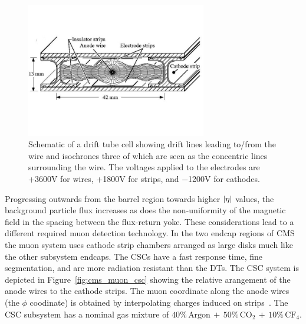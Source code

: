 \begin{figure}[htbp]
\centering
     \includegraphics[width=0.7\textwidth]{cms_and_lhc/plots/cms_muon_dt.jpg}
     \caption{
Schematic of a drift tube cell showing drift lines leading to/from the wire 
and isochrones three of which are seen as the concentric lines surrounding the wire. The voltages applied to the 
electrodes are +3600V for wires, +1800V for strips, and −1200V for cathodes.
     }
     \label{fig:cms_muon_dt}
\end{figure}

Progressing outwards from the barrel region towards higher $\lvert\eta\rvert$ values, the background 
particle flux increases as does the non-uniformity of the magnetic field in the spacing between
the flux-return yoke. These considerations lead to a different required muon detection technology.
In the two endcap regions of CMS the muon system uses cathode strip chambers arranged as large
disks much like the other subsystem endcaps. The CSCs have a fast 
response time, fine segmentation, and are more radiation resistant than the DTs. The CSC system
is depicted in Figure~\ref{fig:cms_muon_csc} showing the relative arangement of the anode
wires to the cathode strips. The muon coordinate along the anode wires (the $\phi$ coodinate) 
is obtained by interpolating charges induced on strips~\cite{cms_csc_gas}.
The CSC subsystem has a nominal gas mixture of 
$40\% \, \textrm{Argon} \, + \, 50\% \, \textrm{CO}_{2} \, + \, 10\% \, \textrm{CF}_{4}$.


